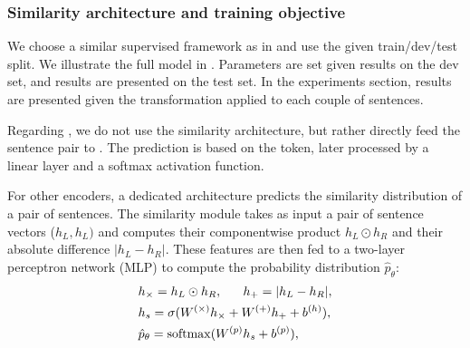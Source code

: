 \subsubsection{Similarity architecture and training objective}
\label{sec:training-setup}
We choose a similar supervised framework as in \textcite{tai_15} and use the given train/dev/test split. We illustrate the full model in . Parameters are set given results on the dev set, and results are presented on the test set. In the experiments section, results are presented given the transformation applied to each couple of sentences. 





Regarding \bert, we do not use the similarity architecture, but rather directly feed the sentence pair to \bert. The prediction is based on the \cls token, later processed by a linear layer and a softmax activation function.

For other encoders, a dedicated architecture predicts the similarity distribution of a pair of sentences. The similarity module takes as input a pair of sentence vectors ($h_{L}, h_{L})$ and computes their component\-wise product $h_{L} \odot h_{R}$ and their absolute difference $|h_{L} - h_{R}|$. These features are then fed to a two-layer perceptron network (MLP) to compute the probability distribution  $\hat{p}_{\theta}$:
\begin{align}
\begin{split}
&h_{\times}=h_L\odot h_R, ~~~~~h_{+} = |h_L - h_R |, \\
&h_s = \sigma (W^{(\times)}h_{\times} + W^{(+)}h_{+} + b^{(h)}), \\
&\hat{p}_{\theta} = \operatorname{softmax}(W^{(p)}h_s + b^{(p)}),\\
\end{split}
\end{align}

